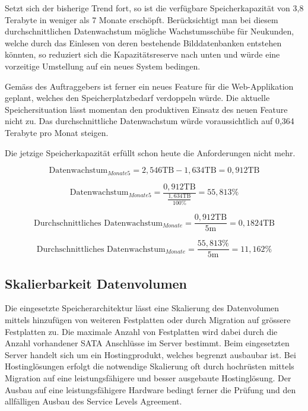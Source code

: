 Setzt sich der bisherige Trend fort, so ist die verfügbare Speicherkapazität von 3,8 Terabyte in weniger als 7 Monate erschöpft. Berücksichtigt man bei diesem durchschnittlichen Datenwachstum mögliche Wachstumsschübe für Neukunden, welche durch das Einlesen von deren bestehende Bilddatenbanken entstehen könnten, so reduziert sich die Kapazitätsreserve nach unten und würde eine vorzeitige Umstellung auf ein neues System bedingen.

Gemäss des Auftraggebers ist ferner ein neues Feature für die Web-Applikation geplant, welches den Speicherplatzbedarf verdoppeln würde. Die aktuelle Speichersituation lässt momentan den produktiven Einsatz des neuen Feature nicht zu. Das durchschnittliche Datenwachstum würde voraussichtlich auf 0,364 Terabyte pro Monat steigen.

Die jetzige Speicherkapazität erfüllt schon heute die Anforderungen nicht mehr.

\begin{equation}
\mbox{Datenwachstum}_{Monate5} = 2,546 \mathrm{TB} - 1,634 \mathrm{TB} = 0,912 \mathrm{TB}
\label{eqn:Verfügbarkeit_5Monate}
\end{equation}

\begin{equation}
\mbox{Datenwachstum}_{Monate5} = \frac{0,912 \mathrm{TB}}{\frac{1,634 \mathrm{TB}}{100 \%}} = 55,813\%
\label{eqn:Verfügbarkeit_5Monate_in_Prozent}
\end{equation}

\begin{equation}
\mbox{Durchschnittliches Datenwachstum}_{Monate} = \frac{0,912 \mathrm{TB}}{5\mathrm{m}} = 0,1824 \mathrm{TB}
\label{eqn:Verfügbarkeit_1Monate}
\end{equation}

\begin{equation}
\mbox{Durchschnittliches Datenwachstum}_{Monate} = \frac{55,813\%}{5 \mathrm{m}} = 11,162\%
\label{eqn:Verfügbarkeit_1Monate_in_Prozent}
\end{equation}

\subsection{Skalierbarkeit Datenvolumen}\label{AnalyseSkalierbarkeitDatenvolumen}
Die eingesetzte Speicherarchitektur lässt eine Skalierung des Datenvolumen mittels hinzufügen von weiteren Festplatten oder durch Migration auf grössere Festplatten zu. Die maximale Anzahl von Festplatten wird dabei durch die Anzahl vorhandener SATA Anschlüsse im Server bestimmt. Beim eingesetzten Server handelt sich um ein Hostingprodukt, welches begrenzt ausbaubar ist. Bei Hostinglösungen erfolgt die notwendige Skalierung oft durch hochrüsten mittels Migration auf eine leistungsfähigere und besser ausgebaute Hostinglösung. Der Ausbau auf eine leistungsfähigere Hardware bedingt ferner die Prüfung und den allfälligen Ausbau des Service Levels Agreement. 

